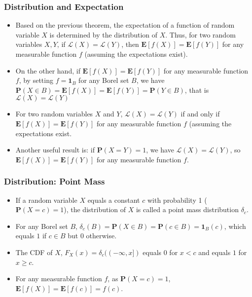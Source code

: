 \documentclass[handout]{beamer}
\newcommand{\BP}{\mathbf{P}}
\newcommand{\BE}{\mathbf{E}}
\newcommand{\BI}{\mathbf{1}}
\begin{document}
\frame
{
  \frametitle{Distribution and Expectation}

   \begin{itemize}
  
                \item<1-> Based on the previous theorem, the expectation of a function of random variable $X$ is determined by the distribution of $X$. Thus, for two random variables $X, Y$, if $\mathcal{L}(X)=\mathcal{L}(Y)$, then $\BE[f(X)]=\BE[f(Y)]$ for any measurable function $f$ (assuming the expectations exist). 
                
                \item<2-> On the other hand, if $\BE[f(X)]=\BE[f(Y)]$ for any measurable function $f$, by setting $f=\BI_{B}$ for any Borel set $B$, we have $\BP(X\in B)=\BE[f(X)]=\BE[f(Y)]=\BP(Y\in B)$, that is $\mathcal{L}(X)=\mathcal{L}(Y)$
                
                
               \item<3->[] \begin{Corollary}[6.1.3.] For two random variables $X$ and $Y$,  $\mathcal{L}(X)=\mathcal{L}(Y)$ if and only if $\BE[f(X)]=\BE[f(Y)]$ for any measurable function $f$ (assuming the expectations exist. \end{Corollary}
                               
             \item<4-> Another useful result is: if $\BP(X=Y)=1$, we have $\mathcal{L}(X)=\mathcal{L} (Y)$, so $\BE[f(X)]=\BE[f(Y)]$ for any measurable function $f$.
            
\end{itemize}
}



\frame
{
  \frametitle{Distribution: Point Mass}

   \begin{itemize}
  
                \item<1-> If a random variable $X$ equals a constant $c$ with probability 1 ($\BP(X=c)=1$), the distribution of $X$ is called a point mass distribution $\delta_c$. 
                
                                \item<2->  For any Borel set $B$, $\delta_c(B)=\BP(X\in B)=\BP(c\in B)=\BI_B(c)$, which equals $1$ if $c\in B$ but $0$ otherwise.
                                
                                

                                                \item<3->  The CDF of $X$, $F_X(x)=\delta_c((-\infty, x])$ equals $0$ for $x<c$ and equals $1$ for $x\geq c$.
                                                
                                                \item<4->  For any measurable function $f$, as $\BP(X=c)=1$, $\BE[f(X)]=\BE[f(c)]=f(c)$. \end{itemize}
}
\end{document}

